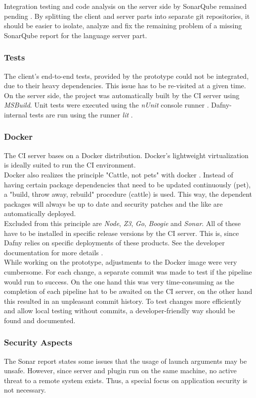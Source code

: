 Integration testing and code analysis on the server side by SonarQube remained pending \cite{sa}.
By splitting the client and server parts into separate git repositories,
it should be easier to isolate, analyze and fix the remaining problem of a missing SonarQube report for the language server part.

\subsubsection{Tests}
The client's end-to-end tests, provided by the prototype could not be integrated, due to their heavy dependencies.
This issue has to be re-visited at a given time. \\

On the server side, the project was automatically built by the CI server using \textit{MSBuild}.
Unit tests were executed using the \textit{nUnit} console runner \cite{nunit}.
Dafny-internal tests are run using the runner \textit{lit} \cite{lit}.

\subsubsection{Docker}
The CI server bases on a Docker distribution.
Docker's lightweight virtualization is ideally suited to run the CI environment.\\

Docker also realizes the principle "Cattle, not pets" with docker \cite{pets-vs-cattle}.
Instead of having certain package dependencies that need to be updated continuously (pet), a "build, throw away, rebuild" procedure (cattle) is used.
This way, the dependent packages will always be up to date and security patches and the like are automatically deployed.\\

Excluded from this principle are \textit{Node}, \textit{Z3}, \textit{Go}, \textit{Boogie} and \textit{Sonar}.
All of these have to be installed in specific release versions by the CI server.
This is, since Dafny relies on specific deployments of these products.
See the developer documentation for more details \cite{dev}.\\

While working on the prototype, adjustments to the Docker image were very cumbersome.
For each change, a separate commit was made to test if the pipeline would run to success.
On the one hand this was very time-consuming as the completion of each pipeline hat to be awaited on the CI server,
on the other hand this resulted in an unpleasant commit history.
To test changes more efficiently and allow local testing without commits,
a developer-friendly way should be found and documented.

\subsubsection{Security Aspects}
The Sonar report states some issues that the usage of launch arguments may be unsafe.
However, since server and plugin run on the same machine, no active threat to a remote system exists.
Thus, a special focus on application security is not necessary.
